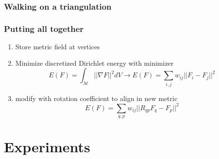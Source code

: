 \documentclass[
	11pt, %
	aspectratio=169, %
]{beamer}
\begin{document}
\begin{frame}
	\frametitle{Walking on a triangulation}
	\begin{figure}[htb]
		\centering
		\def\svgwidth{0.8\linewidth}
		
		\label{fig:walking}
	\end{figure}
\end{frame}

\begin{frame}
	\frametitle{Putting all together}
	\begin{enumerate}
		\item Store metric field at vertices
		\item Minimize discretized Dirichlet energy with minimizer
		\begin{equation}
			E(F)=\int_{\mathcal{M}}||\nabla F||^2dV \longrightarrow E(F)= \sum_{i,j} w_{ij}||F_i-F_j||^2
		\end{equation}
		\item modify with rotation coefficient to align in new metric
		\begin{equation}
			E(F)= \sum_{q,p} w_{ij}||R_{qp}F_q-F_p||^2
		\end{equation}
	\end{enumerate}

\end{frame}

\section{Experiments}
\end{document}
